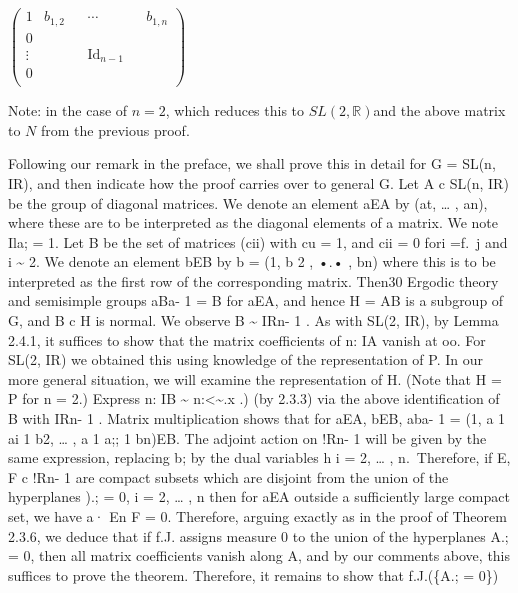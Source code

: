 \documentclass[
]{article}
\newcommand{\sltr}{\ensuremath{SL(2, \mathbb{R})}}
\begin{document}
\begin{math}
  \begin{pmatrix}
    1 & b_{1,2} & & \cdots & & b_{1,n} \\
    0 & & &  & \\
    \vdots & & & \text{Id}_{n-1} & \\
    0 & & & & \\
  \end{pmatrix}
\end{math}

Note: in the case of $n = 2$, which reduces this to \sltr and the above matrix to $N$ from the previous proof.





 Following our remark in the preface, we shall
prove this in detail for G = SL(n, IR), and then indicate how the proof
carries over to general G. Let A c SL(n, IR) be the group of diagonal
matrices. We denote an element aEA by (at, \ldots{} , an), where these
are to be interpreted as the diagonal elements of a matrix. We note Ila;
= 1. Let B be the set of matrices (cii) with cu = 1, and cii = 0 fori
=f.~j and i \textasciitilde{} 2. We denote an element bEB by b = (1, b 2
, •.• , bn) where this is to be interpreted as the first row of the
corresponding matrix. Then30 Ergodic theory and semisimple groups aBa- 1
= B for aEA, and hence H = AB is a subgroup of G, and B c H is normal.
We observe B \textasciitilde{} IRn- 1 . As with SL(2, IR), by Lemma
2.4.1, it suffices to show that the matrix coefficients of n: IA vanish
at oo. For SL(2, IR) we obtained this using knowledge of the
representation of P. In our more general situation, we will examine the
representation of H. (Note that H = P for n = 2.) Express n: IB
\textasciitilde{} n:\textless\textasciitilde.x .) (by 2.3.3) via the
above identification of B with IRn- 1 . Matrix multiplication shows that
for aEA, bEB, aba- 1 = (1, a 1 ai 1 b2, \ldots{} , a 1 a;; 1 bn)EB. The
adjoint action on !Rn- 1 will be given by the same expression, replacing
b; by the dual variables h i = 2, \ldots{} , n.~Therefore, if E, F c
!Rn- 1 are compact subsets which are disjoint from the union of the
hyperplanes ).; = 0, i = 2, \ldots{} , n then for aEA outside a
sufficiently large compact set, we have a· En F = 0. Therefore, arguing
exactly as in the proof of Theorem 2.3.6, we deduce that if f.J. assigns
measure 0 to the union of the hyperplanes A.; = 0, then all matrix
coefficients vanish along A, and by our comments above, this suffices to
prove the theorem. Therefore, it remains to show that f.J.(\{A.; = 0\})
\end{document}
